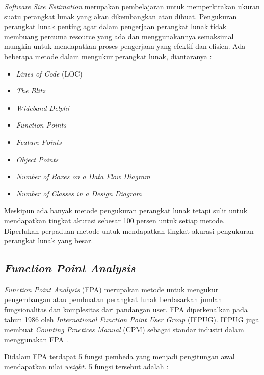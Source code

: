 \documentclass[a4paper]{article}
\begin{document}
\begin{multicols}{2}
\par \textit{Software Size Estimation} merupakan pembelajaran untuk memperkirakan ukuran suatu perangkat lunak yang akan dikembangkan atau dibuat. Pengukuran perangkat lunak penting agar dalam pengerjaan perangkat lunak tidak membuang percuma resource yang ada dan menggunakannya semaksimal mungkin untuk mendapatkan proses pengerjaan yang efektif dan efisien. Ada beberapa metode dalam mengukur perangkat lunak, diantaranya :

\begin{itemize}
  \item \textit{Lines of Code} (LOC)
  \item \textit{The Blitz}
  \item \textit{Wideband Delphi}
  \item \textit{Function Points}
  \item \textit{Feature Points}
  \item \textit{Object Points}
  \item \textit{Number of Boxes on a Data Flow Diagram}
  \item \textit{Number of Classes in a Design Diagram}
\end{itemize}

\par Meskipun ada banyak metode pengukuran perangkat lunak tetapi sulit untuk mendapatkan tingkat akurasi sebesar 100 persen untuk setiap metode. Diperlukan perpaduan metode untuk mendapatkan tingkat akurasi pengukuran perangkat lunak yang besar.

\subsection{\textit{Function Point Analysis}}

\par \textit{Function Point Analysis} (FPA) merupakan metode untuk mengukur pengembangan atau pembuatan perangkat lunak berdasarkan jumlah fungsionalitas dan komplesitas dari pandangan user. FPA diperkenalkan pada tahun 1986 oleh \textit{International Function Point User Group} (IFPUG). IFPUG juga membuat \textit{Counting Practices Manual} (CPM) sebagai standar industri dalam menggunakan FPA \citep{Tunali2014}. 

\par Didalam FPA terdapat 5 fungsi pembeda yang menjadi pengitungan awal mendapatkan nilai \textit{weight.} 5 fungsi tersebut adalah \citep{Pradani2013} :


\end{multicols}
\end{document}
